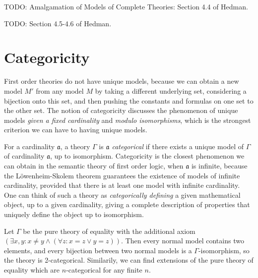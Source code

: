 TODO: Amalgamation of Models of Complete Theories: Section 4.4 of Hedman.

TODO: Section 4.5-4.6 of Hedman.

\section{Categoricity}

First order theories do not have unique models, because we can obtain a new model $M'$ from any model $M$ by taking a different underlying set, considering a bijection onto this set, and then pushing the constants and formulas on one set to the other set. The notion of categoricity discusses the phenomenon of unique models \emph{given a fixed cardinality} and \emph{modulo isomorphisms}, which is the strongest criterion we can have to having unique models.

For a cardinality $\mathfrak{a}$, a theory $\Gamma$ is \emph{$\mathfrak{a}$ categorical} if there exists a unique model of $\Gamma$ of cardinality $\mathfrak{a}$, up to isomorphism. Categoricity is the closest phenomenon we can obtain in the semantic theory of first order logic, when $\mathfrak{a}$ is infinite, because the L\"{o}wenheim-Skolem theorem guarantees the existence of models of infinite cardinality, provided that there is at least one model with infinite cardinality. One can think of such a theory as \emph{categorically defining} a given mathematical object, up to a given cardinality, giving a complete description of properties that uniquely define the object up to isomorphism.

\begin{example}
    Let $\Gamma$ be the pure theory of equality with the additional axiom $(\exists x,y: x \neq y \wedge (\forall z: x = z \vee y = z))$. Then every normal model contains two elements, and every bijection between two normal models is a $\Gamma$-isomorphism, so the theory is 2-categorical. Similarily, we can find extensions of the pure theory of equality which are $n$-categorical for any finite $n$.
\end{example}

